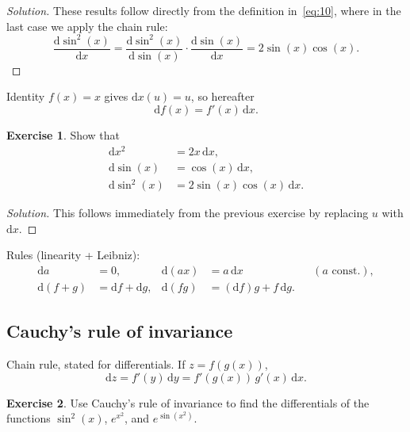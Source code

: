 \documentclass[14pt]{extarticle}
\theoremstyle{plain}
\theoremstyle{definition}
\newtheorem{exercise}{Exercise}
\theoremstyle{remark}
\newenvironment{solution}{%
  \begin{proof}[Solution]%
}{%
  \end{proof}%
}
\newcommand{\dd}{\mathrm{d}}
\begin{document}
\begin{solution}
These results follow directly from the definition in~\eqref{eq:10}, where in the last case we apply the chain rule:
\[
\frac{\dd\sin^2(x)}{\dd x} = \frac{\dd\sin^2(x)}{\dd\sin(x)} \cdot \frac{\dd\sin(x)}{\dd x} = 2\sin(x)\cos(x).
\]
\end{solution}

Identity $f(x)=x$ gives $\dd x(u) = u$, so hereafter
\begin{equation}\label{eq:11}
\dd f(x) = f'(x)\, \dd x.
\end{equation}

\begin{exercise}\label{exer:7}
Show that
\begin{align*}
\dd x^2 &= 2x\, \dd x, \\
\dd\sin(x) &= \cos(x)\, \dd x, \\
\dd\sin^2(x) &= 2\sin(x)\cos(x)\, \dd x.
\end{align*}
\end{exercise}

\begin{solution}
This follows immediately from the previous exercise by replacing $u$ with $\dd x$.
\end{solution}

Rules (linearity + Leibniz):
\begin{equation}\label{eq:12}
\begin{aligned}
\dd a &= 0, & \dd(ax) &= a\, \dd x & &(a \text{ const.}), \\
\dd(f + g) &= \dd f + \dd g, & \dd(fg) &= (\dd f)g + f\, \dd g.
\end{aligned}
\end{equation}

\subsection{Cauchy's rule of invariance}\label{sec:4.2}

Chain rule, stated for differentials. If $z = f(g(x))$,
\begin{equation}\label{eq:13}
\dd z = f'(y)\, \dd y = f'(g(x))\, g'(x)\, \dd x.
\end{equation}

\begin{exercise}\label{exer:8}
Use Cauchy's rule of invariance to find the differentials of the functions $\sin^2(x)$, $e^{x^2}$, and $e^{\sin(x^2)}$.
\end{exercise}
\end{document}
